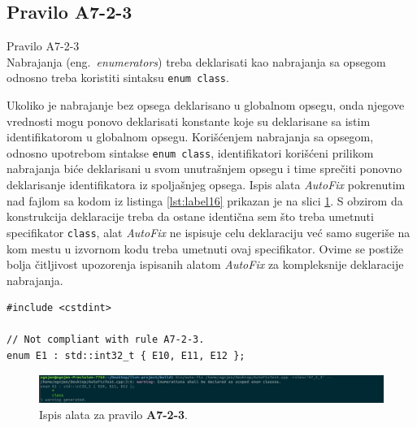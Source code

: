 \documentclass[12pt,oneside]{memoir}
\begin{document}
\subsection{Pravilo A7-2-3}
\begin{center}
\begin{tcolorbox}
Pravilo A7-2-3 \\
Nabrajanja (eng.~\textit{enumerators}) treba deklarisati kao nabrajanja sa opsegom odnosno treba koristiti sintaksu \texttt{enum class}.
\end{tcolorbox}
\end{center}

Ukoliko je nabrajanje bez opsega deklarisano u globalnom opsegu, onda njegove vrednosti mogu ponovo deklarisati konstante koje su deklarisane sa istim identifikatorom u globalnom opsegu. Kori\v{s}\'{c}enjem nabrajanja sa opsegom, odnosno upotrebom sintakse \texttt{enum class}, identifikatori kori\v{s}\'{c}eni prilikom
nabrajanja bi\'{c}e deklarisani u svom unutra\v{s}njem opsegu i time spre\v{c}iti ponovno deklarisanje identifikatora iz spolja\v{s}njeg opsega. 
Ispis alata \textit{AutoFix} pokrenutim nad fajlom sa kodom iz listinga \ref{lst:label16} prikazan je na slici \ref{fig:A7-2-3}. 
S obzirom da konstrukcija deklaracije treba da ostane identi\v{c}na sem \v{s}to treba umetnuti specifikator \texttt{class}, alat \textit{AutoFix} ne ispisuje celu deklaraciju ve\'{c} samo sugeri\v{s}e na kom mestu u izvornom kodu treba umetnuti ovaj specifikator. Ovime se posti\v{z}e bolja \v{c}itljivost upozorenja ispisanih alatom \textit{AutoFix} za kompleksnije deklaracije nabrajanja.
\\

\begin{lstlisting}[style=customc, caption={Primer koda koji nije napisan u skladu sa pravilom \textbf{A7-2-3}, odnosno ne koristi sintaksu \texttt{enum class}.}, label=lst:label16]
#include <cstdint>

// Not compliant with rule A7-2-3.
enum E1 : std::int32_t { E10, E11, E12 };

\end{lstlisting}


\begin{figure}[!h]
\begin{center}
\includegraphics[scale=0.3]{A7-2-3.png}
\end{center}
\caption{Ispis alata za pravilo \textbf{A7-2-3}.}
\label{fig:A7-2-3}
\end{figure}
\end{document}
